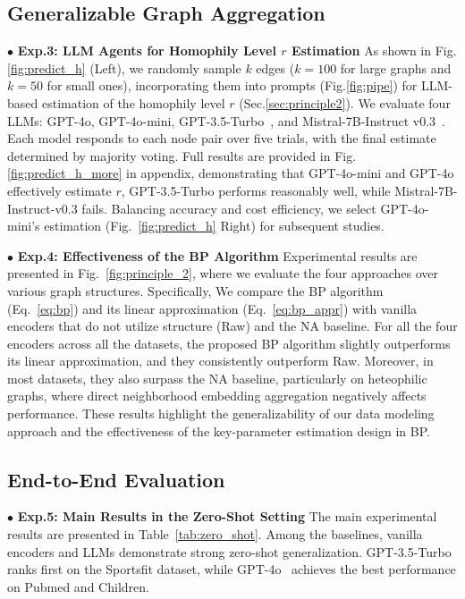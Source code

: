 \subsection{Generalizable Graph Aggregation}




$\bullet$ \textbf{Exp.3: LLM Agents for Homophily Level $r$ Estimation} As shown in Fig.\ref{fig:predict_h} (Left), we randomly sample $k$ edges ($k=100$ for large graphs and $k=50$ for small ones), incorporating them into prompts (Fig.\ref{fig:pipe}) for LLM-based estimation of the homophily level $r$ (Sec.\ref{sec:principle2}). We evaluate four LLMs: GPT-4o, GPT-4o-mini\cite{hurst2024gpt}, GPT-3.5-Turbo~\cite{achiam2023gpt}, and Mistral-7B-Instruct v0.3~\cite{jiang2023mistral}. Each model responds to each node pair over five trials, with the final estimate determined by majority voting. Full results are provided in Fig.\ref{fig:predict_h_more} in appendix, demonstrating that GPT-4o-mini and GPT-4o effectively estimate $r$, GPT-3.5-Turbo performs reasonably well, while Mistral-7B-Instruct-v0.3 fails. Balancing accuracy and cost efficiency, we select GPT-4o-mini's estimation (Fig.~\ref{fig:predict_h} Right) for subsequent studies. %

$\bullet$ \textbf{Exp.4: Effectiveness of the BP Algorithm}
Experimental results are presented in Fig.~\ref{fig:principle_2}, where we evaluate the four approaches over various graph structures. Specifically, We compare the BP algorithm (Eq.~\ref{eq:bp}) and its linear approximation (Eq.~\ref{eq:bp_appr}) with vanilla encoders that do not utilize structure (Raw) and the NA baseline. For all the four encoders across all the datasets, the proposed BP algorithm slightly outperforms its linear approximation, and they consistently outperform Raw. Moreover, in most datasets, they also surpass the NA baseline, particularly on heteophilic graphs, where direct neighborhood embedding aggregation negatively affects performance. These results highlight the generalizability of our data modeling approach and the effectiveness of the key-parameter estimation design in BP.


\subsection{End-to-End Evaluation}

$\bullet$ \textbf{Exp.5: Main Results in the Zero-Shot Setting}
The main experimental results are presented in Table~\ref{tab:zero_shot}. Among the baselines, vanilla encoders and LLMs demonstrate strong zero-shot generalization. GPT-3.5-Turbo~\cite{achiam2023gpt} ranks first on the Sportsfit dataset, while GPT-4o~\cite{hurst2024gpt} achieves the best performance on Pubmed and Children.


